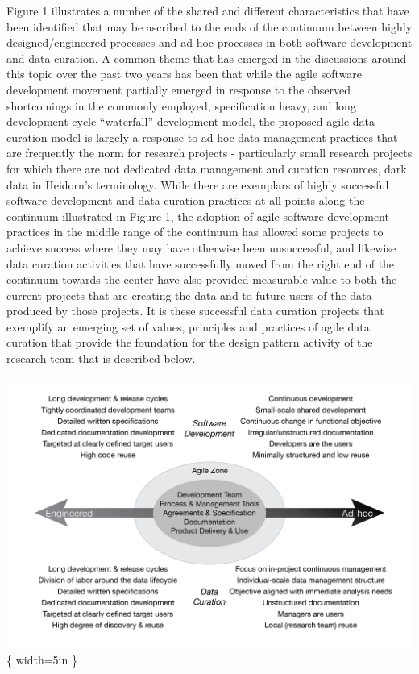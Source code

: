 \documentclass[paper]{ijdc-v9}
\begin{document}
Figure 1 illustrates a number of the shared and different
characteristics that have been identified that may be ascribed to the
ends of the continuum between highly designed/engineered processes and
ad-hoc processes in both software development and data curation. A
common theme that has emerged in the discussions around this topic over
the past two years has been that while the agile software development
movement partially emerged in response to the observed shortcomings in
the commonly employed, specification heavy, and long development cycle
``waterfall'' development model, the proposed agile data curation model
is largely a response to ad-hoc data management practices that are
frequently the norm for research projects - particularly small research
projects for which there are not dedicated data management and curation
resources, dark data in Heidorn's \autocite*{heidorn_shedding_2008}
terminology. While there are exemplars of highly successful software
development and data curation practices at all points along the
continuum illustrated in Figure 1, the adoption of agile software
development practices in the middle range of the continuum has allowed
some projects to achieve success where they may have otherwise been
unsuccessful, and likewise data curation activities that have
successfully moved from the right end of the continuum towards the
center have also provided measurable value to both the current projects
that are creating the data and to future users of the data produced by
those projects. It is these successful data curation projects that
exemplify an emerging set of values, principles and practices of agile
data curation that provide the foundation for the design pattern
activity of the research team that is described below.

\includegraphics{agileComparison-01.png}\{ width=5in \}
\end{document}
